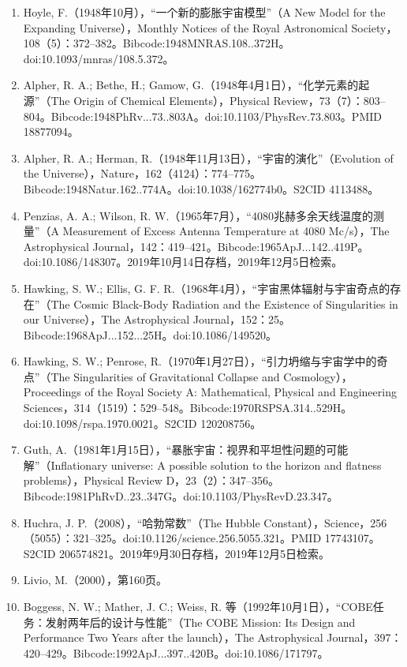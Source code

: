 \begin{enumerate}
\item Hoyle, F.（1948年10月），“一个新的膨胀宇宙模型”（A New Model for the Expanding Universe），Monthly Notices of the Royal Astronomical Society，108（5）：372–382。Bibcode:1948MNRAS.108..372H。doi:10.1093/mnras/108.5.372。  
\item Alpher, R. A.; Bethe, H.; Gamow, G.（1948年4月1日），“化学元素的起源”（The Origin of Chemical Elements），Physical Review，73（7）：803–804。Bibcode:1948PhRv...73..803A。doi:10.1103/PhysRev.73.803。PMID 18877094。  
\item Alpher, R. A.; Herman, R.（1948年11月13日），“宇宙的演化”（Evolution of the Universe），Nature，162（4124）：774–775。Bibcode:1948Natur.162..774A。doi:10.1038/162774b0。S2CID 4113488。  
\item Penzias, A. A.; Wilson, R. W.（1965年7月），“4080兆赫多余天线温度的测量”（A Measurement of Excess Antenna Temperature at 4080 Mc/s），The Astrophysical Journal，142：419–421。Bibcode:1965ApJ...142..419P。doi:10.1086/148307。2019年10月14日存档，2019年12月5日检索。  
\item Hawking, S. W.; Ellis, G. F. R.（1968年4月），“宇宙黑体辐射与宇宙奇点的存在”（The Cosmic Black-Body Radiation and the Existence of Singularities in our Universe），The Astrophysical Journal，152：25。Bibcode:1968ApJ...152...25H。doi:10.1086/149520。  
\item Hawking, S. W.; Penrose, R.（1970年1月27日），“引力坍缩与宇宙学中的奇点”（The Singularities of Gravitational Collapse and Cosmology），Proceedings of the Royal Society A: Mathematical, Physical and Engineering Sciences，314（1519）：529–548。Bibcode:1970RSPSA.314..529H。doi:10.1098/rspa.1970.0021。S2CID 120208756。  
\item Guth, A.（1981年1月15日），“暴胀宇宙：视界和平坦性问题的可能解”（Inflationary universe: A possible solution to the horizon and flatness problems），Physical Review D，23（2）：347–356。Bibcode:1981PhRvD..23..347G。doi:10.1103/PhysRevD.23.347。  
\item Huchra, J. P.（2008），“哈勃常数”（The Hubble Constant），Science，256（5055）：321–325。doi:10.1126/science.256.5055.321。PMID 17743107。S2CID 206574821。2019年9月30日存档，2019年12月5日检索。  
\item Livio, M.（2000），第160页。  
\item Boggess, N. W.; Mather, J. C.; Weiss, R. 等（1992年10月1日），“COBE任务：发射两年后的设计与性能”（The COBE Mission: Its Design and Performance Two Years after the launch），The Astrophysical Journal，397：420–429。Bibcode:1992ApJ...397..420B。doi:10.1086/171797。  

\end{enumerate}
